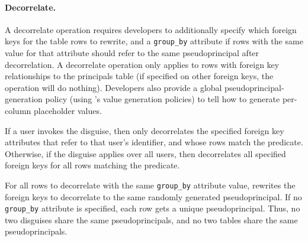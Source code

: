 %
\paragraph{Decorrelate.}
%
A decorrelate operation requires developers to additionally specify \one{} which
foreign keys for the table rows to rewrite, and \two{} a
\texttt{group\_by} attribute if rows with the same value for that attribute
should refer to the same pseudoprincipal after decorrelation.
%
A decorrelate operation only applies to rows with foreign key relationships to
the principals table (if specified on other foreign keys, the operation will do
nothing).
%
Developers also provide a global pseudoprincipal-generation policy
(using \sys's value generation policies) to tell \sys how to generate per-column
placeholder values.
%

%
If a user invokes the disguise, then \sys only decorrelates the specified
foreign key attributes that refer to that user's identifier, and whose
rows match the predicate. 
%
Otherwise, if the disguise applies over all users, then \sys decorrelates all
specified foreign keys for all rows matching the predicate.
%

%
For all rows to decorrelate with the same \texttt{group\_by} attribute value,
\sys rewrites the foreign keys to decorrelate to the same randomly generated
pseudoprincipal.
%
If no \texttt{group\_by} attribute is specified, each row gets a unique
pseudoprincipal.
%
Thus, no two disguises share the same pseudoprincipals, and no two tables share
the same pseudoprincipals.
%

%
